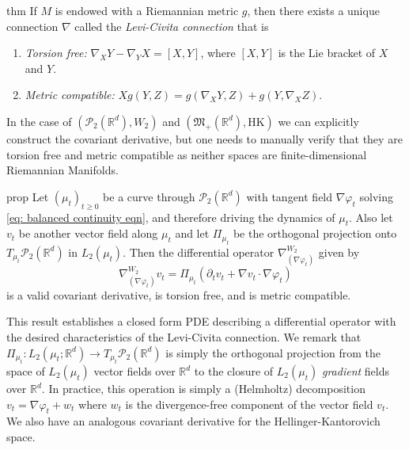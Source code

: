 \documentclass[11pt]{article}
\newcommand{\man}{M}
\newcommand{\posm}{\mathfrak{M}_+(\mathbb{R}^d)}
\begin{document}
\begin{restatable}{thm}{}
    If $\man$ is endowed with a Riemannian metric $g$, then there exists a unique connection $\nabla$ called the \textit{Levi-Civita connection} that is
    \begin{enumerate}
        \item \textit{Torsion free:} $\nabla_XY - \nabla_YX = [X,Y]$, where $[X,Y]$ is the Lie bracket of $X$ and $Y$. 
        \item \textit{Metric compatible:} $Xg(Y, Z) = g(\nabla_XY, Z) + g(Y, \nabla_XZ).$ 
    \end{enumerate}
\end{restatable}
In the case of $(\mathcal{P}_2(\mathbb{R}^d), W_2)$ and $(\posm, \text{HK})$ we can explicitly construct the covariant derivative, but one needs to manually verify that they are torsion free and metric compatible as neither spaces are finite-dimensional Riemannian Manifolds.

\begin{restatable}{prop}{} \label{Wasserstein covariant deriv}
    Let $(\mu_t)_{t\geq 0}$ be a curve through $\mathcal{P}_2(\mathbb{R}^d)$ with tangent field $\nabla \varphi_t$ solving \cref{eq: balanced continuity eqn}, and therefore driving the dynamics of $\mu_t$. Also let $v_t$ be another vector field along $\mu_t$ and let $\Pi_{\mu_t}$ be the orthogonal projection onto $T_{\mu_t}\mathcal{P}_2(\mathbb{R}^d)$ in $L_2(\mu_t)$. Then the differential operator $\nabla_{(\nabla\varphi_t)}^{W_2}$ given by
    \begin{equation*}
        \nabla_{(\nabla\varphi_t)}^{W_2}v_t = \Pi_{\mu_t}\left(\partial_t v_t + \nabla v_t \cdot \nabla \varphi_t\right)
    \end{equation*}
    is a valid covariant derivative, is torsion free, and is metric compatible. 
\end{restatable}
This result establishes a closed form PDE describing a differential operator with the desired characteristics of the Levi-Civita connection. We remark that $\Pi_{\mu_t}: L_2(\mu_t; \mathbb{R}^d) \rightarrow T_{\mu_t}\mathcal{P}_2(\mathbb{R}^d)$ is simply the orthogonal projection from the space of $L_2(\mu_t)$ vector fields over $\mathbb{R}^d$ to the closure of $L_2(\mu_t)$ \textit{gradient} fields over $\mathbb{R}^d$. In practice, this operation is simply a (Helmholtz) decomposition $v_t = \nabla \varphi_t + w_t$ where $w_t$ is the divergence-free component of the vector field $v_t$. We also have an analogous covariant derivative for the Hellinger-Kantorovich space.
\end{document}

